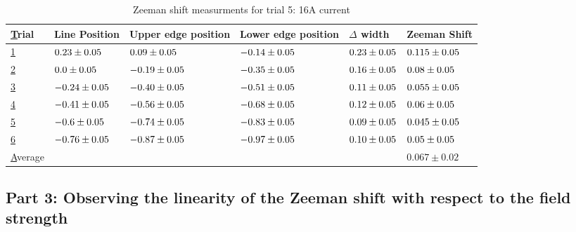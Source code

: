 \begin{table}
    \begin{adjustwidth}{-100pt}{-100pt}
        \centering
        \begin{tabular}{|l|l|l|l|l|l|}
            \hline
            {\ul Trial}   & Line Position                & Upper edge position          & Lower edge position          & $\Delta$ width              & Zeeman Shift                 \\ \hline
            {\ul 1}       & $0.23 \pm 0.05$  & $0.09 \pm 0.05$  & $-0.14 \pm 0.05$ & $0.23 \pm 0.05$ & $0.115 \pm 0.05$ \\ \hline
            {\ul 2}       & $0.0 \pm 0.05$   & $-0.19 \pm 0.05$ & $-0.35 \pm 0.05$ & $0.16 \pm 0.05$ & $0.08 \pm 0.05$  \\ \hline
            {\ul 3}       & $-0.24 \pm 0.05$ & $-0.40 \pm 0.05$ & $-0.51 \pm 0.05$ & $0.11 \pm 0.05$ & $0.055 \pm 0.05$ \\ \hline
            {\ul 4}       & $-0.41 \pm 0.05$ & $-0.56 \pm 0.05$ & $-0.68 \pm 0.05$ & $0.12 \pm 0.05$ & $0.06 \pm 0.05$  \\ \hline
            {\ul 5}       & $-0.6 \pm 0.05$  & $-0.74 \pm 0.05$ & $-0.83 \pm 0.05$ & $0.09 \pm 0.05$ & $0.045 \pm 0.05$ \\ \hline
            {\ul 6}       & $-0.76 \pm 0.05$ & $-0.87 \pm 0.05$ & $-0.97 \pm 0.05$ & $0.10 \pm 0.05$ & $0.05 \pm 0.05$  \\ \hline
            {\ul Average} &                              &                              &                              &                             & $0.067 \pm 0.02$             \\ \hline
        \end{tabular}
    \end{adjustwidth}

    \caption{Zeeman shift measurments for trial 5: 16A current}

\end{table}

\subsection{Part 3: Observing the linearity of the Zeeman shift with respect to the field strength}

